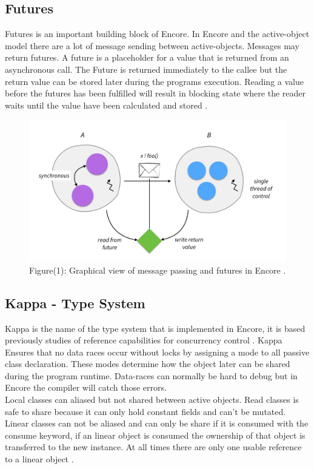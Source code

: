 \subsection{Futures}
Futures is an important building block of Encore. In Encore and the active-object model there are a lot of message sending between active-objects. Messages may return futures. A future is a placeholder for a value that is returned from an asynchronous call. The Future is returned immediately to the callee but the return value can be stored later during the programs execution. Reading a value before the futures has been fulfilled will result in blocking state where the reader waits until the value have been calculated and stored \citep{encore_paper}.

\begin{figure}[h]
\includegraphics[width=12cm]{images/active-model-figure}
Figure(1): Graphical view of message passing and futures in Encore \citep{encore_paper}.
\end{figure}

\subsection{Kappa - Type System}
Kappa is the name of the type system that is implemented in Encore, it is based previously studies of reference capabilities for concurrency control \citep{kappa}\citep{lolcat}. Kappa Ensures that no data races occur without locks by assigning a mode to all passive class declaration. These modes determine how the object later can be shared during the program runtime. Data-races can normally be hard to debug but in Encore the compiler will catch those errors. \\ 

Local classes can aliased but not shared between active objects. Read classes is safe to share because it can only hold constant fields and can't be mutated. Linear classes can not be aliased and can only be share if it is consumed with the consume keyword, if an linear object is consumed the ownership of that object is transferred to the new instance. At all times there are only one usable reference to a linear object \citep{encore}. 

